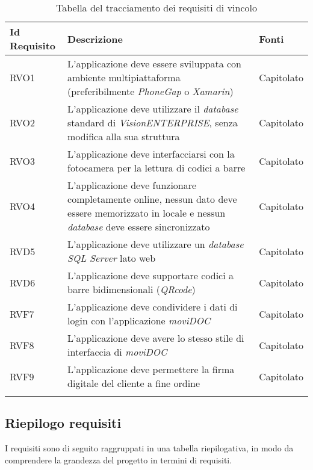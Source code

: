 {\renewcommand{\arraystretch}{2}
\begin{center}
\begin{longtable}{ | >{\centering\arraybackslash}p{2.5cm} | >{\arraybackslash}p{7cm} | >{\centering\arraybackslash}p{2cm} | }
\hline
\textbf{Id Requisito} & \textbf{Descrizione} & \textbf{Fonti} \\ \hline
\endhead
RVO1 & L'applicazione deve essere sviluppata con ambiente multipiattaforma (preferibilmente \textit{PhoneGap} o \textit{Xamarin}) & Capitolato \\ \hline
RVO2 & L'applicazione deve utilizzare il \textit{database} standard di \textit{VisionENTERPRISE}, senza modifica alla sua struttura & Capitolato \\ \hline
RVO3 & L'applicazione deve interfacciarsi con la fotocamera per la lettura di codici a barre & Capitolato \\ \hline
RVO4 & L'applicazione deve funzionare completamente online, nessun dato deve essere memorizzato in locale e nessun \textit{database} deve essere sincronizzato & Capitolato \\ \hline
RVD5 & L'applicazione deve utilizzare un \textit{database} \textit{SQL Server} lato web & Capitolato \\ \hline
RVD6 & L'applicazione deve supportare codici a barre bidimensionali (\textit{QRcode}) & Capitolato \\ \hline
RVF7 & L'applicazione deve condividere i dati di login con l'applicazione \textit{moviDOC} & Capitolato \\ \hline
RVF8 & L'applicazione deve avere lo stesso stile di interfaccia di \textit{moviDOC} & Capitolato \\ \hline
RVF9 & L'applicazione deve permettere la firma digitale del cliente a fine ordine & Capitolato \\ \hline
\caption{Tabella del tracciamento dei requisiti di vincolo}
\end{longtable}
\end{center}}

\newpage

\subsection{Riepilogo requisiti}

I requisiti sono di seguito raggruppati in una tabella riepilogativa, in modo da comprendere la grandezza del progetto in termini di requisiti.

